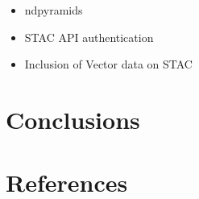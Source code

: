\documentclass[
  oneside,
  open=any]{scrbook}
\providecommand{\tightlist}{%
  \setlength{\itemsep}{0pt}\setlength{\parskip}{0pt}}\usepackage{longtable,booktabs,array}
\begin{document}
\begin{itemize}
\tightlist
\item
  ndpyramids
\item
  STAC API authentication
\item
  Inclusion of Vector data on STAC
\end{itemize}

\chapter{Conclusions}\label{conclusions}

\chapter*{References}\label{references}
\end{document}
